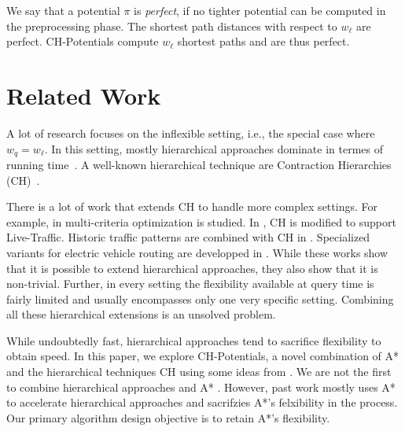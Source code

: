 \documentclass[letterpaper]{article} %
\begin{document}
We say that a potential $\pi$ is \emph{perfect}, if no tighter potential can be computed in the preprocessing phase.
The shortest path distances with respect to $w_\ell$ are perfect.
CH-Potentials compute $w_\ell$ shortest paths and are thus perfect.

\section{Related Work}

A lot of research focuses on the inflexible setting, i.e., the special case where $w_q = w_\ell$.
In this setting, mostly hierarchical approaches dominate in termes of running time~\cite{dgpw-crprn-13,ss-ehh-12}. 
A well-known hierarchical technique are Contraction Hierarchies (CH)~\cite{gssv-erlrn-12,dsw-cch-15}.

There is a lot of work that extends CH to handle more complex settings.
For example, in \cite{fns-opca-14,gks-rpfof-10} multi-criteria optimization is studied.
In \cite{dsw-cch-15}, CH is modified to support Live-Traffic.
Historic traffic patterns are combined with CH in \cite{swz-sfert-19,bgsv-mtdtt-13,bdpw-dtdrp-16}.
Specialized variants for electric vehicle routing are developped in \cite{bdgwz-sfpcs-19}.
While these works show that it is possible to extend hierarchical approaches, they also show that it is non-trivial.
Further, in every setting the flexibility available at query time is fairly limited and usually encompasses only one very specific setting.
Combining all these hierarchical extensions is an unsolved problem.

While undoubtedly fast, hierarchical approaches tend to sacrifice flexibility to obtain speed.
In this paper, we explore CH-Potentials, a novel combination of A* and the hierarchical techniques CH using some ideas from \cite{dgnw-phast-13}.
We are not the first to combine hierarchical approaches and A* \cite{bdsssw-chgds-10,gkw-blwr-07,bdgwz-sfpcs-19}.
However, past work mostly uses A* to accelerate hierarchical approaches and sacrifzies A*'s felxibility in the process.
Our primary algorithm design objective is to retain A*'s flexibility.
\end{document}
